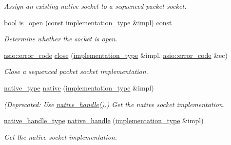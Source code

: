 \begin{DoxyCompactItemize}
\begin{DoxyCompactList}\small\item\em Assign an existing native socket to a sequenced packet socket. \end{DoxyCompactList}\item 
bool \hyperlink{classasio_1_1seq__packet__socket__service_ac2c2d77271d442377eea940f42e073f1}{is\+\_\+open} (const \hyperlink{classasio_1_1seq__packet__socket__service_a6e1d2027450d7a5d8ea7896a3de0c8ff}{implementation\+\_\+type} \&impl) const 
\begin{DoxyCompactList}\small\item\em Determine whether the socket is open. \end{DoxyCompactList}\item 
\hyperlink{classasio_1_1error__code}{asio\+::error\+\_\+code} \hyperlink{classasio_1_1seq__packet__socket__service_a3806de4454cbd57972157c4eece9f4ac}{close} (\hyperlink{classasio_1_1seq__packet__socket__service_a6e1d2027450d7a5d8ea7896a3de0c8ff}{implementation\+\_\+type} \&impl, \hyperlink{classasio_1_1error__code}{asio\+::error\+\_\+code} \&ec)
\begin{DoxyCompactList}\small\item\em Close a sequenced packet socket implementation. \end{DoxyCompactList}\item 
\hyperlink{classasio_1_1seq__packet__socket__service_a50a688faafd55ee40b087c28b398efc2}{native\+\_\+type} \hyperlink{classasio_1_1seq__packet__socket__service_a53de2788313876a0b72a816d4eb8b704}{native} (\hyperlink{classasio_1_1seq__packet__socket__service_a6e1d2027450d7a5d8ea7896a3de0c8ff}{implementation\+\_\+type} \&impl)
\begin{DoxyCompactList}\small\item\em (Deprecated\+: Use \hyperlink{classasio_1_1seq__packet__socket__service_a23271da7d60663e209f3f31bd127deaa}{native\+\_\+handle()}.) Get the native socket implementation. \end{DoxyCompactList}\item 
\hyperlink{classasio_1_1seq__packet__socket__service_a80d5af14e0e6580995b0a64de71f6f9a}{native\+\_\+handle\+\_\+type} \hyperlink{classasio_1_1seq__packet__socket__service_a23271da7d60663e209f3f31bd127deaa}{native\+\_\+handle} (\hyperlink{classasio_1_1seq__packet__socket__service_a6e1d2027450d7a5d8ea7896a3de0c8ff}{implementation\+\_\+type} \&impl)
\begin{DoxyCompactList}\small\item\em Get the native socket implementation. \end{DoxyCompactList}\item 

\end{DoxyCompactItemize}

